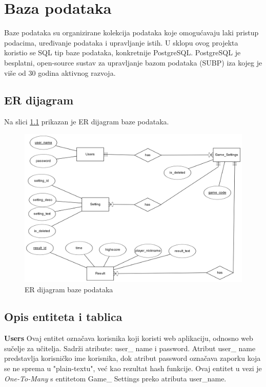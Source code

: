 \documentclass[times, utf8, zavrsni, numeric]{fer}
\begin{document}
	
\chapter{Baza podataka}
	Baze podataka su organizirane kolekcija podataka koje omogućavaju laki pristup podacima, uređivanje podataka i upravljanje istih. U sklopu ovog projekta koristio se
	SQL tip baze podataka, konkretnije PostgreSQL. PostgreSQL je besplatni, open-source sustav za upravljanje bazom podataka (SUBP) iza kojeg je više od 30 godina aktivnog razvoja.
	
	
	\section{ER dijagram}
		Na slici \ref{fig:erdijagram} prikazan je ER dijagram baze podataka.
		\begin{figure}[H]
			\includegraphics[width=\linewidth]{"slike/ER.png"} 
			\centering
			\caption{ER dijagram baze podataka}
			\label{fig:erdijagram}
		\end{figure}


	\section{Opis entiteta i tablica}
			\textbf {Users} \hspace{5mm}
			{Ovaj entitet označava korisnika koji koristi web aplikaciju, odnosno web sučelje za učitelja. Sadrži atribute: user\_ name i password.
			Atribut user\_ name predstavlja korisničko ime korisnika, dok atribut password označava zaporku koja se ne sprema u "plain-textu", već kao 
			rezultat hash funkcije.
			Ovaj entitet u vezi je \textit{One-To-Many} s entitetom Game\_ Settings preko atributa user\_name.}
				
\end{document}
